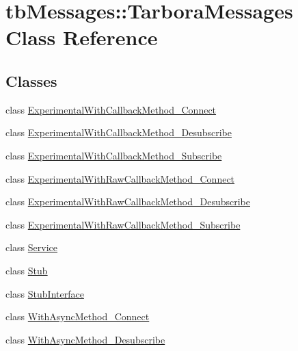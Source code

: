 \hypertarget{classtbMessages_1_1TarboraMessages}{}\section{tb\+Messages\+:\+:Tarbora\+Messages Class Reference}
\label{classtbMessages_1_1TarboraMessages}
\subsection*{Classes}
\begin{DoxyCompactItemize}
\item 
class \hyperlink{classtbMessages_1_1TarboraMessages_1_1ExperimentalWithCallbackMethod__Connect}{Experimental\+With\+Callback\+Method\+\_\+\+Connect}
\item 
class \hyperlink{classtbMessages_1_1TarboraMessages_1_1ExperimentalWithCallbackMethod__Desubscribe}{Experimental\+With\+Callback\+Method\+\_\+\+Desubscribe}
\item 
class \hyperlink{classtbMessages_1_1TarboraMessages_1_1ExperimentalWithCallbackMethod__Subscribe}{Experimental\+With\+Callback\+Method\+\_\+\+Subscribe}
\item 
class \hyperlink{classtbMessages_1_1TarboraMessages_1_1ExperimentalWithRawCallbackMethod__Connect}{Experimental\+With\+Raw\+Callback\+Method\+\_\+\+Connect}
\item 
class \hyperlink{classtbMessages_1_1TarboraMessages_1_1ExperimentalWithRawCallbackMethod__Desubscribe}{Experimental\+With\+Raw\+Callback\+Method\+\_\+\+Desubscribe}
\item 
class \hyperlink{classtbMessages_1_1TarboraMessages_1_1ExperimentalWithRawCallbackMethod__Subscribe}{Experimental\+With\+Raw\+Callback\+Method\+\_\+\+Subscribe}
\item 
class \hyperlink{classtbMessages_1_1TarboraMessages_1_1Service}{Service}
\item 
class \hyperlink{classtbMessages_1_1TarboraMessages_1_1Stub}{Stub}
\item 
class \hyperlink{classtbMessages_1_1TarboraMessages_1_1StubInterface}{Stub\+Interface}
\item 
class \hyperlink{classtbMessages_1_1TarboraMessages_1_1WithAsyncMethod__Connect}{With\+Async\+Method\+\_\+\+Connect}
\item 
class \hyperlink{classtbMessages_1_1TarboraMessages_1_1WithAsyncMethod__Desubscribe}{With\+Async\+Method\+\_\+\+Desubscribe}
\item 

\end{DoxyCompactItemize}

